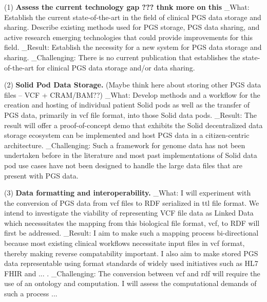 \documentclass[11pt]{article}
\begin{document}
(1) \textbf{Assess the current technology gap ??? thnk more on this}
_What: Establish the current state-of-the-art in the field of clinical PGS data storage and sharing. Describe existing methods used for PGS storage, PGS data sharing, and active research emerging technologies that could provide improvements for this field. 
_Result: Establish the necessity for a new system for PGS data storage and sharing. 
_Challenging: There is no current publication that establishes the state-of-the-art for clinical PGS data storage and/or data sharing.



(2) \textbf{Solid Pod Data Storage.} (Maybe think here about storing other PGS data files -- VCF + CRAM/BAM??)
_What: Develop methods and a workflow for the creation and hosting of individual patient Solid pods as well as the transfer of PGS data, primarily in vcf file format, into those Solid data pods. 
_Result: The result will offer a proof-of-concept demo that exhibits the Solid decentralized data storage ecosystem can be implemented and host PGS data in a citizen-centric architecture.
_Challenging: Such a framework for genome data has not been undertaken before in the literature and most past implementations of Solid data pod use cases have not been designed to handle the large data files that are present with PGS data. 


(3) \textbf{Data formatting and interoperability.} 
_What: I will experiment with the conversion of PGS data from vcf files to RDF serialized in ttl file format. 
We intend to investigate the viability of representing VCF file data as Linked Data which necesssitates the mapping from this biological file format, vcf, to RDF will first be addressed. 
_Result: I aim to make such a mapping process bi-directional because most existing clinical workflows necessitate input files in vcf format, thereby making reverse compatability important. 
I also aim to make stored PGS data representable using format standards of widely used initiatives such as HL7 FHIR and ... . 
_Challenging: The conversion between vcf and rdf will require the use of an ontology and computation. 
I will assess the computational demands of such a process ... 


\end{document}

